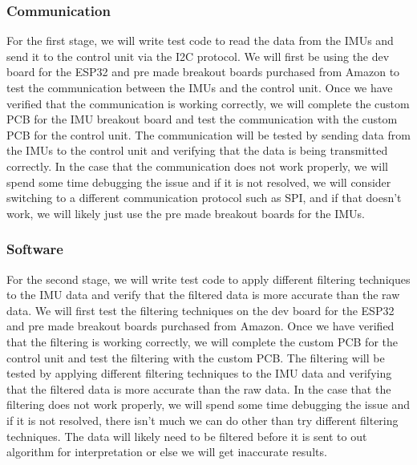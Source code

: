 \documentclass[12pt]{article}
\begin{document}
\subsubsection{Communication}
For the first stage, we will write test code to read the data from the IMUs and send it to the control unit via the I2C protocol. We will first be using the dev board for the ESP32 and pre made breakout boards purchased from Amazon to test the communication between the IMUs and the control unit. Once we have verified that the communication is working correctly, we will complete the custom PCB for the IMU breakout board and test the communication with the custom PCB for the control unit. The communication will be tested by sending data from the IMUs to the control unit and verifying that the data is being transmitted correctly. In the case that the communication does not work properly, we will spend some time debugging the issue and if it is not resolved, we will consider switching to a different communication protocol such as SPI, and if that doesn't work, we will likely just use the pre made breakout boards for the IMUs.
\subsubsection{Software}
For the second stage, we will write test code to apply different filtering techniques to the IMU data and verify that the filtered data is more accurate than the raw data. We will first test the filtering techniques on the dev board for the ESP32 and pre made breakout boards purchased from Amazon. Once we have verified that the filtering is working correctly, we will complete the custom PCB for the control unit and test the filtering with the custom PCB. The filtering will be tested by applying different filtering techniques to the IMU data and verifying that the filtered data is more accurate than the raw data. In the case that the filtering does not work properly, we will spend some time debugging the issue and if it is not resolved, there isn't much we can do other than try different filtering techniques. The data will likely need to be filtered before it is sent to out algorithm for interpretation or else we will get inaccurate results.
\end{document}
